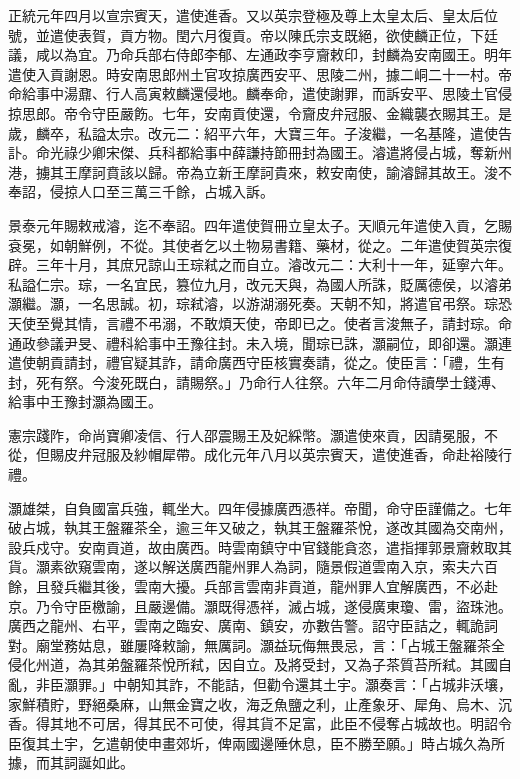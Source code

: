 \begin{pinyinscope}
正統元年四月以宣宗賓天，遣使進香。又以英宗登極及尊上太皇太后、皇太后位號，並遣使表賀，貢方物。閏六月復貢。帝以陳氏宗支既絕，欲使麟正位，下廷議，咸以為宜。乃命兵部右侍郎李郁、左通政李亨齎敕印，封麟為安南國王。明年遣使入貢謝恩。時安南思郎州土官攻掠廣西安平、思陵二州，據二峒二十一村。帝命給事中湯鼐、行人高寅敕麟還侵地。麟奉命，遣使謝罪，而訴安平、思陵土官侵掠思郎。帝令守臣嚴飭。七年，安南貢使還，令齎皮弁冠服、金織襲衣賜其王。是歲，麟卒，私謚太宗。改元二：紹平六年，大寶三年。子浚繼，一名基隆，遣使告訃。命光祿少卿宋傑、兵科都給事中薛謙持節冊封為國王。濬遣將侵占城，奪新州港，擄其王摩訶賁該以歸。帝為立新王摩訶貴來，敕安南使，諭濬歸其故王。浚不奉詔，侵掠人口至三萬三千餘，占城入訴。

景泰元年賜敕戒濬，迄不奉詔。四年遣使賀冊立皇太子。天順元年遣使入貢，乞賜袞冕，如朝鮮例，不從。其使者乞以土物易書籍、藥材，從之。二年遣使賀英宗復辟。三年十月，其庶兄諒山王琮弒之而自立。濬改元二：大利十一年，延寧六年。私謚仁宗。琮，一名宜民，篡位九月，改元天與，為國人所誅，貶厲德侯，以濬弟灝繼。灝，一名思誠。初，琮弒濬，以游湖溺死奏。天朝不知，將遣官弔祭。琮恐天使至覺其情，言禮不弔溺，不敢煩天使，帝即已之。使者言浚無子，請封琮。命通政參議尹旻、禮科給事中王豫往封。未入境，聞琮已誅，灝嗣位，即卻還。灝連遣使朝貢請封，禮官疑其詐，請命廣西守臣核實奏請，從之。使臣言：「禮，生有封，死有祭。今浚死既白，請賜祭。」乃命行人往祭。六年二月命侍讀學士錢溥、給事中王豫封灝為國王。

憲宗踐阼，命尚寶卿凌信、行人邵震賜王及妃綵幣。灝遣使來貢，因請冕服，不從，但賜皮弁冠服及紗帽犀帶。成化元年八月以英宗賓天，遣使進香，命赴裕陵行禮。

灝雄桀，自負國富兵強，輒坐大。四年侵據廣西憑祥。帝聞，命守臣謹備之。七年破占城，執其王盤羅茶全，逾三年又破之，執其王盤羅茶悅，遂改其國為交南州，設兵戍守。安南貢道，故由廣西。時雲南鎮守中官錢能貪恣，遣指揮郭景齎敕取其貨。灝素欲窺雲南，遂以解送廣西龍州罪人為詞，隨景假道雲南入京，索夫六百餘，且發兵繼其後，雲南大擾。兵部言雲南非貢道，龍州罪人宜解廣西，不必赴京。乃令守臣檄諭，且嚴邊備。灝既得憑祥，滅占城，遂侵廣東瓊、雷，盜珠池。廣西之龍州、右平，雲南之臨安、廣南、鎮安，亦數告警。詔守臣詰之，輒詭詞對。廟堂務姑息，雖屢降敕諭，無厲詞。灝益玩侮無畏忌，言：「占城王盤羅茶全侵化州道，為其弟盤羅茶悅所弒，因自立。及將受封，又為子茶質苔所弒。其國自亂，非臣灝罪。」中朝知其詐，不能詰，但勸令還其土宇。灝奏言：「占城非沃壤，家鮮積貯，野絕桑麻，山無金寶之收，海乏魚鹽之利，止產象牙、犀角、烏木、沉香。得其地不可居，得其民不可使，得其貨不足富，此臣不侵奪占城故也。明詔令臣復其土宇，乞遣朝使申畫郊圻，俾兩國邊陲休息，臣不勝至願。」時占城久為所據，而其詞誕如此。


\end{pinyinscope}
